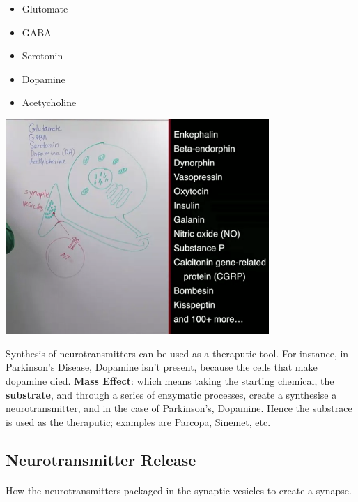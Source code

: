 \documentclass[12pt, a4paper]{article}
\begin{document}
\begin{itemize}
    \item Glutomate
    \item GABA
    \item Serotonin
    \item Dopamine
    \item Acetycholine
\end{itemize}

{
    \centering
    \includegraphics[width=10cm]{Neurtransmitters_SynapticVesicles.png}

}

Synthesis of neurotransmitters can be used as a theraputic tool. For instance,
in Parkinson's Disease, Dopamine isn't present, because the cells that make dopamine died.
\textbf{Mass Effect}: which means taking the starting chemical, the \textbf{substrate},
and through a series of enzymatic processes, create a synthesise a neurotransmitter,
and in the case of Parkinson's, Dopamine. Hence the substrace is used as the theraputic; examples are
Parcopa, Sinemet, etc.

\subsection{Neurotransmitter Release}
\paragraph*{}
How the neurotransmitters packaged in the synaptic vesicles to create a synapse.
\end{document}
